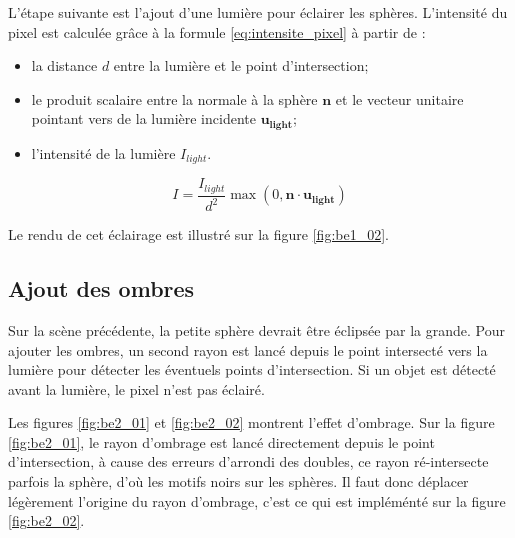 \documentclass[12pt,a4paper,twoside]{report}
\begin{document}
L'étape suivante est l'ajout d'une lumière pour éclairer les sphères. L'intensité du pixel est calculée grâce à la formule \eqref{eq:intensite_pixel} à partir de :
\begin{itemize}
	\item la distance $d$ entre la lumière et le point d'intersection;
	\item le produit scalaire entre la normale à la sphère $\mathbf{n}$ et le vecteur unitaire pointant vers de la lumière incidente $\mathbf{u_{light}}$;
	\item l'intensité de la lumière $I_{light}$.
\end{itemize}

\begin{equation}
	\label{eq:intensite_pixel}
	I = \frac{I_{light}}{d^2}\max\left(0, \mathbf n \cdot \mathbf{u_{light}}\right)
\end{equation}

Le rendu de cet éclairage est illustré sur la figure \ref{fig:be1_02}.

\subsection{Ajout des ombres}

Sur la scène précédente, la petite sphère devrait être éclipsée par la grande. Pour ajouter les ombres, un second rayon est lancé depuis le point intersecté vers la lumière pour détecter les éventuels points d'intersection. Si un objet est détecté avant la lumière, le pixel n'est pas éclairé.

Les figures \ref{fig:be2_01} et \ref{fig:be2_02} montrent l'effet d'ombrage. Sur la figure \ref{fig:be2_01}, le rayon d'ombrage est lancé directement depuis le point d'intersection, à cause des erreurs d'arrondi des doubles, ce rayon ré-intersecte parfois la sphère, d'où les motifs noirs sur les sphères. Il faut donc déplacer légèrement l'origine du rayon d'ombrage, c'est ce qui est impléménté sur la figure \ref{fig:be2_02}.
\end{document}
